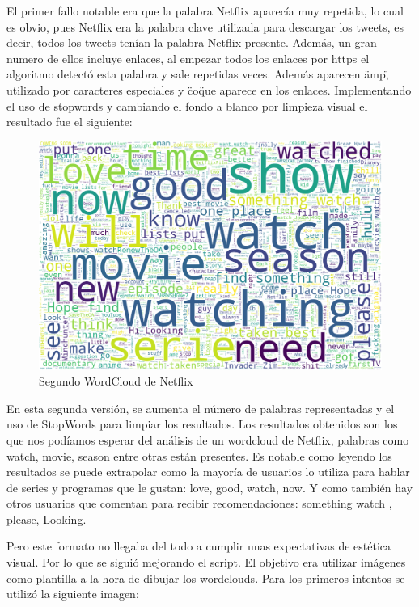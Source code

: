 El primer fallo notable era que la palabra Netflix aparecía muy repetida, lo cual es obvio, pues Netflix era la palabra clave utilizada para descargar los tweets, es decir, todos los tweets tenían la palabra Netflix presente. Además, un gran numero de ellos incluye enlaces, al empezar todos los enlaces por https el algoritmo detectó esta palabra y sale repetidas veces. Además aparecen \"amp\", utilizado por caracteres especiales y \"co\" que aparece en los enlaces. Implementando el uso de stopwords y cambiando el fondo a blanco por limpieza visual el resultado fue el siguiente: 

\begin{figure}[H]
	\centering
	\includegraphics[scale=.3]{imagenes/NetflixAll.png}
	\caption{Segundo WordCloud de Netflix}
	\label{fig:wordcloudNetflix2}
\end{figure} 
 
En esta segunda versión, se aumenta el número de palabras representadas y el uso de StopWords para limpiar los resultados. Los resultados obtenidos son los que nos podíamos esperar del análisis de un wordcloud de Netflix, palabras como watch, movie, season entre otras están presentes. Es notable como leyendo los resultados se puede extrapolar como la mayoría de usuarios lo utiliza para hablar de series y programas que le gustan: love, good, watch, now. Y como también hay otros usuarios que comentan para recibir recomendaciones: something watch ,  please, Looking. 


Pero este formato no llegaba del todo a cumplir unas expectativas de estética visual. Por lo que se siguió mejorando el script. El objetivo era utilizar imágenes como plantilla a la hora de dibujar los wordclouds. Para los primeros intentos se utilizó la siguiente imagen: 


